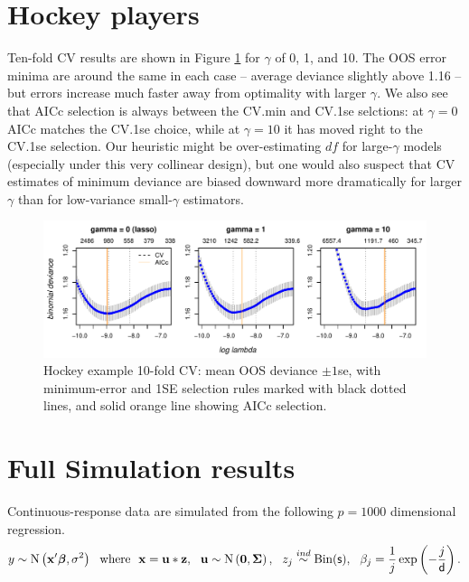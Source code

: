 \documentclass[12pt]{article}
\newcommand{\bs}[1]{\boldsymbol{#1}}
\newcommand{\mr}[1]{\mathrm{#1}}
\newcommand{\bm}[1]{\mathbf{#1}}
\begin{document}
\section{Hockey players}

Ten-fold CV results are shown in Figure
\ref{nhlcv} for $\gamma$ of 0, 1, and 10.  The OOS error minima are around the
same in each case -- average deviance slightly above 1.16 -- but errors
increase much faster away from optimality with larger $\gamma$.   We also see
that AICc selection is always between the CV.min and CV.1se selctions:  at
$\gamma=0$ AICc matches the CV.1se choice, while at $\gamma=10$ it has moved
right to the CV.1se  selection.  Our heuristic might be
over-estimating $df$ for large-$\gamma$ models (especially under this very
collinear design), but one would also suspect that CV estimates of minimum
deviance are biased downward more dramatically for larger $\gamma$ than for
low-variance small-$\gamma$ estimators.


\begin{figure}[h!]
\includegraphics[width=\textwidth]{graphs/nhl_cv}
\caption{\label{nhlcv} Hockey example 10-fold CV: mean OOS deviance $\pm 1$se, with minimum-error and 1SE selection rules marked with black dotted lines, and solid orange line showing AICc selection. }
\end{figure}


\section{Full Simulation results}

Continuous-response data are simulated from
 the following $p=1000$ dimensional regression.
\begin{align}
\label{simdgp}
y \sim \mr{N}\left(\bm{x}'\bs{\beta},\sigma^2\right)~~\text{where}~~\bm{x} = \bm{u}*\bm{z},~~\bm{u}\sim \mr{N}\left(\bm{0},\bs{\Sigma}\right),~~z_{j} \stackrel{ind}{\sim} \mr{Bin}({\sf s}),~~\beta_j = \frac{1}{j}\exp\left(-\frac{j}{{\sf d}}\right).
\end{align}
\end{document}
